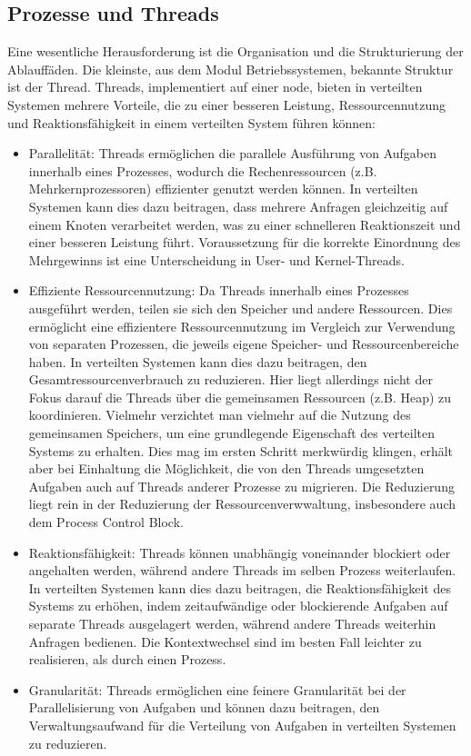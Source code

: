 \subsection{Prozesse und Threads}
Eine wesentliche Herausforderung ist die Organisation und die Strukturierung der Ablauffäden. Die kleinste, aus dem Modul Betriebssystemen, bekannte Struktur ist der Thread. Threads, implementiert auf einer node, bieten in verteilten Systemen mehrere Vorteile, die zu einer besseren Leistung, Ressourcennutzung und Reaktionsfähigkeit in einem verteilten System führen können:
\begin{itemize}
\item Parallelität: Threads ermöglichen die parallele Ausführung von Aufgaben innerhalb eines Prozesses, wodurch die Rechenressourcen (z.B. Mehrkernprozessoren) effizienter genutzt werden können. In verteilten Systemen kann dies dazu beitragen, dass mehrere Anfragen gleichzeitig auf einem Knoten verarbeitet werden, was zu einer schnelleren Reaktionszeit und einer besseren Leistung führt. Voraussetzung für die korrekte Einordnung des Mehrgewinns ist eine Unterscheidung in User- und Kernel-Threads.
\item Effiziente Ressourcennutzung: Da Threads innerhalb eines Prozesses ausgeführt werden, teilen sie sich den Speicher und andere Ressourcen. Dies ermöglicht eine effizientere Ressourcennutzung im Vergleich zur Verwendung von separaten Prozessen, die jeweils eigene Speicher- und Ressourcenbereiche haben. In verteilten Systemen kann dies dazu beitragen, den Gesamtressourcenverbrauch zu reduzieren. Hier liegt allerdings nicht der Fokus darauf die Threads über die gemeinsamen Ressourcen (z.B. Heap) zu koordinieren. Vielmehr verzichtet man vielmehr auf die Nutzung des gemeinsamen Speichers, um eine grundlegende Eigenschaft des verteilten Systems zu erhalten. Dies mag  im ersten Schritt merkwürdig klingen, erhält aber bei Einhaltung die Möglichkeit, die von den Threads umgesetzten Aufgaben auch auf Threads anderer Prozesse zu migrieren. Die Reduzierung liegt rein in der Reduzierung der Ressourcenverwwaltung, insbesondere auch dem Process Control Block.  

\item Reaktionsfähigkeit: Threads können unabhängig voneinander blockiert oder angehalten werden, während andere Threads im selben Prozess weiterlaufen. In verteilten Systemen kann dies dazu beitragen, die Reaktionsfähigkeit des Systems zu erhöhen, indem zeitaufwändige oder blockierende Aufgaben auf separate Threads ausgelagert werden, während andere Threads weiterhin Anfragen bedienen. Die Kontextwechsel sind im besten Fall leichter zu realisieren, als durch einen Prozess.

\item Granularität: Threads ermöglichen eine feinere Granularität bei der Parallelisierung von Aufgaben und können dazu beitragen, den Verwaltungsaufwand für die Verteilung von Aufgaben in verteilten Systemen zu reduzieren.
\end{itemize}
